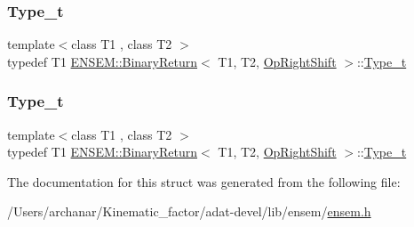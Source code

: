 \mbox{\label{structENSEM_1_1BinaryReturn_3_01T1_00_01T2_00_01OpRightShift_01_4_a5376360119f221e4df1236c273764f02}} 
\subsubsection{\texorpdfstring{Type\_t}{Type\_t}\hspace{0.1cm}{\footnotesize\ttfamily [2/3]}}
{\footnotesize\ttfamily template$<$class T1 , class T2 $>$ \\
typedef T1 \mbox{\hyperlink{structENSEM_1_1BinaryReturn}{E\+N\+S\+E\+M\+::\+Binary\+Return}}$<$ T1, T2, \mbox{\hyperlink{structENSEM_1_1OpRightShift}{Op\+Right\+Shift}} $>$\+::\mbox{\hyperlink{structENSEM_1_1BinaryReturn_3_01T1_00_01T2_00_01OpRightShift_01_4_a5376360119f221e4df1236c273764f02}{Type\+\_\+t}}}

\mbox{\label{structENSEM_1_1BinaryReturn_3_01T1_00_01T2_00_01OpRightShift_01_4_a5376360119f221e4df1236c273764f02}} 
\subsubsection{\texorpdfstring{Type\_t}{Type\_t}\hspace{0.1cm}{\footnotesize\ttfamily [3/3]}}
{\footnotesize\ttfamily template$<$class T1 , class T2 $>$ \\
typedef T1 \mbox{\hyperlink{structENSEM_1_1BinaryReturn}{E\+N\+S\+E\+M\+::\+Binary\+Return}}$<$ T1, T2, \mbox{\hyperlink{structENSEM_1_1OpRightShift}{Op\+Right\+Shift}} $>$\+::\mbox{\hyperlink{structENSEM_1_1BinaryReturn_3_01T1_00_01T2_00_01OpRightShift_01_4_a5376360119f221e4df1236c273764f02}{Type\+\_\+t}}}



The documentation for this struct was generated from the following file\+:\begin{DoxyCompactItemize}
\item 
/\+Users/archanar/\+Kinematic\+\_\+factor/adat-\/devel/lib/ensem/\mbox{\hyperlink{adat-devel_2lib_2ensem_2ensem_8h}{ensem.\+h}}\end{DoxyCompactItemize}
